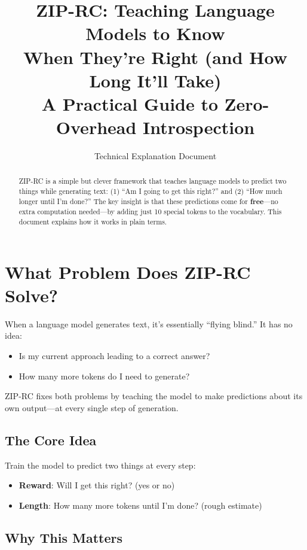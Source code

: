 \documentclass[11pt,a4paper]{article}
\title{\textbf{ZIP-RC: Teaching Language Models to Know\\When They're Right (and How Long It'll Take)}\\[0.5em]
\large A Practical Guide to Zero-Overhead Introspection}
\author{Technical Explanation Document}
\date{}
\begin{document}
\maketitle

\begin{abstract}
ZIP-RC is a simple but clever framework that teaches language models to predict two things while generating text: (1) ``Am I going to get this right?'' and (2) ``How much longer until I'm done?'' The key insight is that these predictions come for \textbf{free}---no extra computation needed---by adding just 10 special tokens to the vocabulary. This document explains how it works in plain terms.
\end{abstract}

\tableofcontents
\newpage

\section{What Problem Does ZIP-RC Solve?}

When a language model generates text, it's essentially ``flying blind.'' It has no idea:
\begin{itemize}
    \item Is my current approach leading to a correct answer?
    \item How many more tokens do I need to generate?
\end{itemize}

ZIP-RC fixes both problems by teaching the model to make predictions about its own output---at every single step of generation.

\subsection{The Core Idea}

Train the model to predict two things at every step:
\begin{itemize}
    \item \textbf{Reward}: Will I get this right? (yes or no)
    \item \textbf{Length}: How many more tokens until I'm done? (rough estimate)
\end{itemize}

\subsection{Why This Matters}
\end{document}
